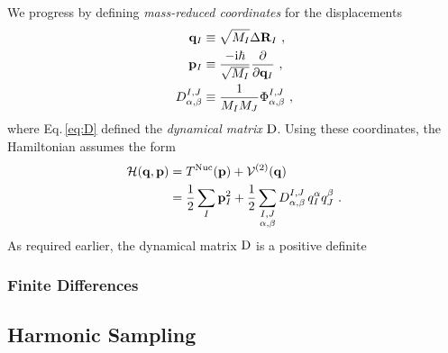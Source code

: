 We progress by defining \emph{mass-reduced coordinates} for the displacements
\begin{align}
	{\bf q}_I 
		&\equiv \sqrt{M_I} \Delta {\bf R}_I~, 
		\label{eq:uI} \\
	{\bf p}_I 
		&\equiv \frac{-{\rm i} \hbar}{\sqrt{M_I}} \frac{\partial}{\partial {\bf q}_I}~,
		\label{eq:pI} \\
	D_{\alpha, \beta}^{I, J}
		&\equiv \frac{1}{M_I M_J} \Phi_{\alpha, \beta}^{I, J}~,
		\label{eq:D}
\end{align}
where Eq.\,\eqref{eq:D} defined the \emph{dynamical matrix }$\rm D$.
Using these coordinates, the Hamiltonian assumes the form
\begin{align}
	\begin{split}
		\mathcal{H}({\bf q}, {\bf p})
			&= T^{\rm Nuc} ({\bf p}) + \mathcal{V}^{(2)} ({\bf q})\\
			&= \frac{1}{2} \sum_I {\bf p}_I^2 + 
				\frac{1}{2} \sum_{\substack{I, J \\ \alpha, \beta}}
					D_{\alpha, \beta}^{I, J}
					\, q_I^\alpha q_J^\beta~.
	\end{split}
	\label{eq:ha.H1}
\end{align}
As required earlier, the dynamical matrix $\rm D$ is a positive definite 


\subsubsection{Finite Differences}
\subsection{Harmonic Sampling}

